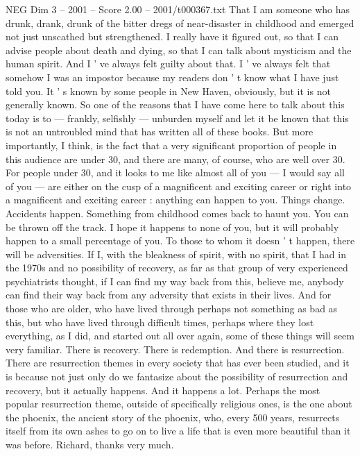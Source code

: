 \begin{textsample}{NEG Dim 3 – 2001 – Score 2.00 – 2001/t000367.txt}
That I am someone who has drunk, drank, drunk of the bitter dregs of near-disaster in childhood and emerged not just unscathed but strengthened.
I really have it figured out, so that I can advise people about death and dying, so that I can talk about mysticism and the human spirit.
And I ' ve always felt guilty about that.
I ' ve always felt that somehow I was an impostor because my readers don ' t know what I have just told you.
It ' s known by some people in New Haven, obviously, but it is not generally known.
So one of the reasons that I have come here to talk about this today is to — frankly, selfishly — unburden myself and let it be known that this is not an untroubled mind that has written all of these books.
But more importantly, I think, is the fact that a very significant proportion of people in this audience are under 30, and there are many, of course, who are well over 30.
For people under 30, and it looks to me like almost all of you — I would say all of you — are either on the cusp of a magnificent and exciting career or right into a magnificent and exciting career : anything can happen to you.
Things change.
Accidents happen.
Something from childhood comes back to haunt you.
You can be thrown off the track.
I hope it happens to none of you, but it will probably happen to a small percentage of you.
To those to whom it doesn ' t happen, there will be adversities.
If I, with the bleakness of spirit, with no spirit, that I had in the 1970s and no possibility of recovery, as far as that group of very experienced psychiatrists thought, if I can find my way back from this, believe me, anybody can find their way back from any adversity that exists in their lives.
And for those who are older, who have lived through perhaps not something as bad as this, but who have lived through difficult times, perhaps where they lost everything, as I did, and started out all over again, some of these things will seem very familiar.
There is recovery.
There is redemption.
And there is resurrection.
There are resurrection themes in every society that has ever been studied, and it is because not just only do we fantasize about the possibility of resurrection and recovery, but it actually happens.
And it happens a lot.
Perhaps the most popular resurrection theme, outside of specifically religious ones, is the one about the phoenix, the ancient story of the phoenix, who, every 500 years, resurrects itself from its own ashes to go on to live a life that is even more beautiful than it was before.
Richard, thanks very much.

\end{textsample}
